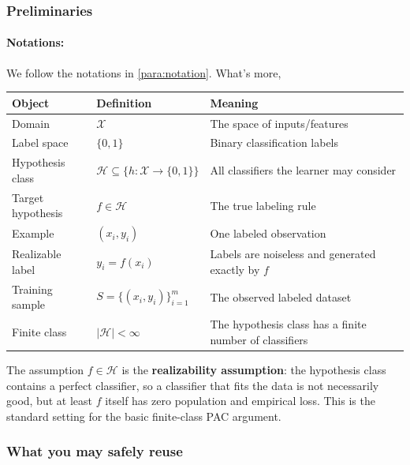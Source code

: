 \documentclass[11pt,a4paper]{article}
\theoremstyle{definition}
\begin{document}
\subsubsection{Preliminaries}

\paragraph*{Notations:}

We follow the notations in \cref{para:notation}. What's more,

{\footnotesize
\setlength{\tabcolsep}{3pt}
\renewcommand{\arraystretch}{1.2}
\noindent
\begin{tabularx}{\linewidth}{|
  >{\raggedright\arraybackslash}p{3.2cm}|
  >{\raggedright\arraybackslash}X|
  >{\raggedright\arraybackslash}X|
}
\hline
\textbf{Object} & \textbf{Definition} & \textbf{Meaning} \\
\hline
Domain & $\mathcal{X}$ & The space of inputs/features \\
\hline
Label space & $\{0, 1\}$ & Binary classification labels \\
\hline
Hypothesis class & $\mathcal{H} \subseteq \{h : \mathcal{X} \to \{0, 1\}\}$ & All classifiers the learner may consider \\
\hline
Target hypothesis & $f \in \mathcal{H}$ & The true labeling rule \\
\hline
Example & $(x_i, y_i)$ & One labeled observation \\
\hline
Realizable label & $y_i = f(x_i)$ & Labels are noiseless and generated exactly by $f$ \\
\hline
Training sample & $S = \{(x_i, y_i)\}_{i=1}^m$ & The observed labeled dataset \\
\hline
Finite class & $|\mathcal{H}| < \infty$ & The hypothesis class has a finite number of classifiers \\
\hline
\end{tabularx}
\par}

\begin{note}
    The assumption $f \in \mathcal{H}$ is the \textbf{realizability assumption}: the hypothesis class contains a perfect classifier, so a classifier that fits the data is not necessarily good, but at least $f$ itself has zero population and empirical loss. This is the standard setting for the basic finite-class PAC argument.
\end{note}


\subsubsection{What you may safely reuse}
\end{document}
